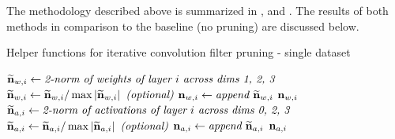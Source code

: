\documentclass{article}
\begin{document}
The methodology described above is summarized in ,  and .
The results of both methods in comparison to the baseline (no pruning) are discussed below.

\begin{algorithm}[t]
	\caption{Helper functions for iterative convolution filter pruning - single dataset} \label{FilterPruneBasic}
	\begin{algorithmic}[1]
				\State $\widetilde{\bm{\mathrm{n}}}_{w,i} \gets \textit{2-norm of weights of layer }i\textit{ across dims 1, 2, 3}$
				\State $\widetilde{\bm{\mathrm{n}}}_{w,i} \gets \widetilde{\bm{\mathrm{n}}}_{w,i} / \max\left \lvert \widetilde{\bm{\mathrm{n}}}_{w,i} \right\rvert \textit{ (optional)}$
				\State $\bm{\mathrm{n}}_{w,i} \gets \textit{append }\widetilde{\bm{\mathrm{n}}}_{w,i}$
			\EndFor
			\State \Return $\bm{\mathrm{n}}_{w,i}$
		\EndFunction
		\\
				\State $\widetilde{\bm{\mathrm{n}}}_{a,i} \gets \textit{2-norm of activations of layer }i\textit{ across dims 0, 2, 3}$
				\State $\widetilde{\bm{\mathrm{n}}}_{a,i} \gets \widetilde{\bm{\mathrm{n}}}_{a,i} / \max\left \lvert \widetilde{\bm{\mathrm{n}}}_{a,i} \right\rvert \textit{ (optional)}$
				\State $\bm{\mathrm{n}}_{a,i} \gets \textit{append }\widetilde{\bm{\mathrm{n}}}_{a,i}$
			\EndFor
			\State \Return $\bm{\mathrm{n}}_{a,i}$
		\EndFunction
%
	\end{algorithmic}
\end{algorithm}
\end{document}
